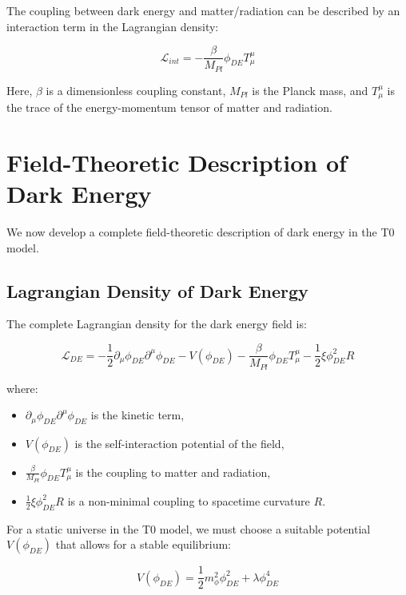 \documentclass[a4paper,12pt]{article}
\begin{document}
The coupling between dark energy and matter/radiation can be described by an interaction term in the Lagrangian density:

\begin{equation}
	\mathcal{L}_{int} = -\frac{\beta}{M_{Pl}} \phi_{DE} T^{\mu}_{\mu}
\end{equation}

Here, $\beta$ is a dimensionless coupling constant, $M_{Pl}$ is the Planck mass, and $T^{\mu}_{\mu}$ is the trace of the energy-momentum tensor of matter and radiation.

\section{Field-Theoretic Description of Dark Energy}

We now develop a complete field-theoretic description of dark energy in the T0 model.

\subsection{Lagrangian Density of Dark Energy}

The complete Lagrangian density for the dark energy field is:

\begin{equation}
	\mathcal{L}_{DE} = -\frac{1}{2}\partial_\mu \phi_{DE} \partial^\mu \phi_{DE} - V(\phi_{DE}) - \frac{\beta}{M_{Pl}} \phi_{DE} T^{\mu}_{\mu} - \frac{1}{2}\xi \phi_{DE}^2 R
\end{equation}

where:
\begin{itemize}
	\item $\partial_\mu \phi_{DE} \partial^\mu \phi_{DE}$ is the kinetic term,
	\item $V(\phi_{DE})$ is the self-interaction potential of the field,
	\item $\frac{\beta}{M_{Pl}} \phi_{DE} T^{\mu}_{\mu}$ is the coupling to matter and radiation,
	\item $\frac{1}{2}\xi \phi_{DE}^2 R$ is a non-minimal coupling to spacetime curvature $R$.
\end{itemize}

For a static universe in the T0 model, we must choose a suitable potential $V(\phi_{DE})$ that allows for a stable equilibrium:

\begin{equation}
	V(\phi_{DE}) = \frac{1}{2}m_{\phi}^2\phi_{DE}^2 + \lambda \phi_{DE}^4
\end{equation}
\end{document}
